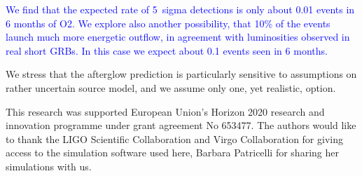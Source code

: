 \documentclass[11pt]{article}
\begin{document}
\textcolor{blue}{We find that the expected rate of 5~sigma detections is only about
0.01 events in 6 months of O2. We explore also another
possibility, that 10\% of the events launch much more energetic
outflow, in agreement with luminosities observed in real short
GRBs. In this case we expect about 0.1 events seen in 6 months.}

We stress that the afterglow prediction is particularly sensitive to
assumptions on rather uncertain source model, and we assume only
one, yet realistic, option.

\vspace{10mm}


{\linespread{0.1} \footnotesize This research was supported European Union's
  Horizon 2020 research and innovation programme under grant agreement No
  653477. The authors would like to thank the LIGO Scientific Collaboration and
  Virgo Collaboration for giving access to the simulation software used here,
  Barbara Patricelli for sharing her simulations with us.}


{\footnotesize
}
\end{document}
